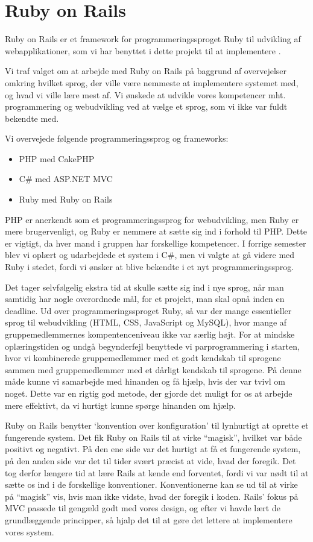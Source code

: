 \chapter{Ruby on Rails}
\label{akademiskror}

Ruby on Rails er et framework for programmeringssproget Ruby til udvikling af webapplikationer, som vi har benyttet i dette projekt til at implementere {\Foodl}.

Vi traf valget om at arbejde med Ruby on Rails på baggrund af overvejelser omkring hvilket sprog, der ville være nemmeste at implementere systemet med, og hvad vi ville lære mest af. Vi ønskede at udvikle vores kompetencer mht. programmering og webudvikling ved at vælge et sprog, som vi ikke var fuldt bekendte med. 

Vi overvejede følgende programmeringssprog og frameworks:

\begin{itemize}[noitemsep]
\item PHP med CakePHP
\item C\# med ASP.NET MVC
\item Ruby med Ruby on Rails
\end{itemize}

PHP er anerkendt som et programmeringssprog for webudvikling, men Ruby er mere brugervenligt, og Ruby er nemmere at sætte sig ind i forhold til PHP. Dette er vigtigt, da hver mand i gruppen har forskellige kompetencer. I forrige semester blev vi oplært og udarbejdede et system i C\#, men vi valgte at gå videre med Ruby i stedet, fordi vi ønsker at blive bekendte i et nyt programmeringssprog.

Det tager selvfølgelig ekstra tid at skulle sætte sig ind i nye sprog, når man samtidig har nogle overordnede mål, for et projekt, man skal opnå inden en deadline. Ud over programmeringssproget Ruby, så var der mange essentieller sprog til webudvikling (HTML, CSS, JavaScript og MySQL), hvor mange af gruppemedlemmernes kompentenceniveau ikke var særlig højt. For at mindske oplæringstiden og undgå begynderfejl benyttede vi parprogrammering i starten, hvor vi kombinerede gruppemedlemmer med et godt kendskab til sprogene sammen med gruppemedlemmer med et dårligt kendskab til sprogene. På denne måde kunne vi samarbejde med hinanden og få hjælp, hvis der var tvivl om noget. Dette var en rigtig god metode, der gjorde det muligt for os at arbejde mere effektivt, da vi hurtigt kunne spørge hinanden om hjælp.

Ruby on Rails benytter `konvention over konfiguration' til lynhurtigt at oprette et fungerende system. Det fik Ruby on Rails til at virke ``magisk'', hvilket var både positivt og negativt. På den ene side var det hurtigt at få et fungerende system, på den anden side var det til tider svært præcist at vide, hvad der foregik. Det tog derfor længere tid at lære Rails at kende end forventet, fordi vi var nødt til at sætte os ind i de forskellige konventioner. Konventionerne kan se ud til at virke på ``magisk'' vis, hvis man ikke vidste, hvad der foregik i koden.
Rails' fokus på MVC passede til gengæld godt med vores design, og efter vi havde lært de grundlæggende principper, så hjalp det til at gøre det lettere at implementere vores system.

